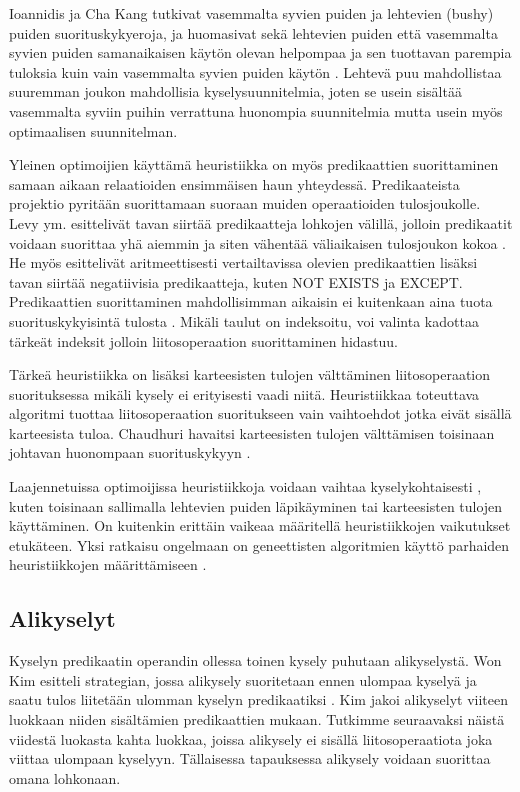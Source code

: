 \documentclass[finnish]{tktltiki2}
\theoremstyle{definition}
\theoremstyle{remark}
\begin{document}
Ioannidis ja Cha Kang tutkivat vasemmalta syvien puiden ja lehtevien (bushy) puiden suorituskykyeroja, ja huomasivat sekä lehtevien puiden että vasemmalta syvien puiden samanaikaisen käytön olevan helpompaa ja sen tuottavan parempia tuloksia kuin vain vasemmalta syvien puiden käytön \cite{ioannidis1991left}. Lehtevä puu mahdollistaa suuremman joukon mahdollisia kyselysuunnitelmia, joten se usein sisältää vasemmalta syviin puihin verrattuna huonompia suunnitelmia mutta usein myös optimaalisen suunnitelman.

Yleinen optimoijien käyttämä heuristiikka on myös predikaattien suorittaminen samaan aikaan relaatioiden ensimmäisen haun yhteydessä. Predikaateista projektio pyritään suorittamaan suoraan muiden operaatioiden tulosjoukolle. Levy ym. esittelivät tavan siirtää predikaatteja lohkojen välillä, jolloin predikaatit voidaan suorittaa yhä aiemmin ja siten vähentää väliaikaisen tulosjoukon kokoa \cite{levy1994query}. He myös esittelivät aritmeettisesti vertailtavissa olevien predikaattien lisäksi tavan siirtää negatiivisia predikaatteja, kuten NOT EXISTS ja EXCEPT. Predikaattien suorittaminen mahdollisimman aikaisin ei kuitenkaan aina tuota suorituskykyisintä tulosta \cite{ramakrishnan2003database}. Mikäli taulut on indeksoitu, voi valinta kadottaa tärkeät indeksit jolloin liitosoperaation suorittaminen hidastuu.

Tärkeä heuristiikka on lisäksi karteesisten tulojen välttäminen liitosoperaation suorituksessa mikäli kysely ei erityisesti vaadi niitä. Heuristiikkaa toteuttava algoritmi tuottaa liitosoperaation suoritukseen vain vaihtoehdot jotka eivät sisällä karteesista tuloa. Chaudhuri havaitsi karteesisten tulojen välttämisen toisinaan johtavan huonompaan suorituskykyyn \cite{chaudhuri1998}. 

Laajennetuissa optimoijissa heuristiikkoja voidaan vaihtaa kyselykohtaisesti \cite{chaudhuri1998}, kuten toisinaan sallimalla lehtevien puiden läpikäyminen tai karteesisten tulojen käyttäminen. On kuitenkin erittäin vaikeaa määritellä heuristiikkojen vaikutukset etukäteen. Yksi ratkaisu ongelmaan on geneettisten algoritmien käyttö parhaiden heuristiikkojen määrittämiseen  \cite{bennett1991genetic}.
\subsection{Alikyselyt}
Kyselyn predikaatin operandin ollessa toinen kysely puhutaan alikyselystä. Won Kim esitteli strategian, jossa alikysely suoritetaan ennen ulompaa kyselyä ja saatu tulos liitetään ulomman kyselyn predikaatiksi \cite{kim1982optimizing}. Kim jakoi alikyselyt viiteen luokkaan niiden sisältämien predikaattien mukaan. Tutkimme seuraavaksi näistä viidestä luokasta kahta luokkaa, joissa alikysely ei sisällä liitosoperaatiota joka viittaa ulompaan kyselyyn. Tällaisessa tapauksessa alikysely voidaan suorittaa omana lohkonaan. 
\newline
\end{document}
